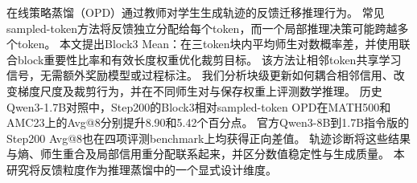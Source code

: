 在线策略蒸馏（OPD）通过教师对学生生成轨迹的反馈迁移推理行为。
常见sampled-token方法将反馈独立分配给每个token，而一个局部推理决策可能跨越多个token。
本文提出Block3 Mean：在三token块内平均师生对数概率差，并使用联合block重要性比率和有效长度权重优化裁剪目标。
该方法让相邻token共享学习信号，无需额外奖励模型或过程标注。
我们分析块级更新如何耦合相邻信用、改变梯度尺度及裁剪行为，并在不同师生对与保存权重上评测数学推理。
历史Qwen3-1.7B对照中，Step200的Block3相对sampled-token OPD在MATH500和AMC23上的Avg@8分别提升8.90和5.42个百分点。
官方Qwen3-8B到1.7B指令版的Step200 Avg@8也在四项评测benchmark上均获得正向差值。
轨迹诊断将这些结果与熵、师生重合及局部信用重分配联系起来，并区分数值稳定性与生成质量。
本研究将反馈粒度作为推理蒸馏中的一个显式设计维度。
